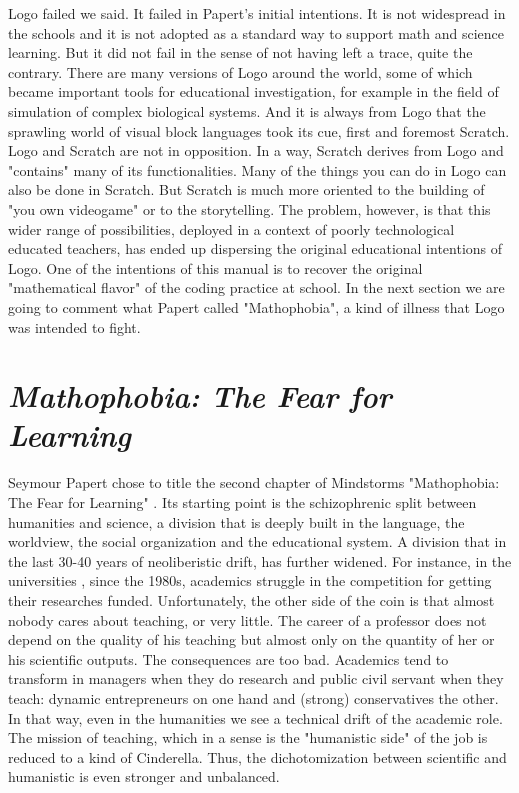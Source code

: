 Logo failed we said. It failed in Papert's initial intentions. It is not widespread in the schools and it is not adopted as a standard way to support math and science learning. But it did not fail in the sense of not having left a trace, quite the contrary. There are many versions of Logo around the world, some of which became important tools for educational investigation, for example in the field of simulation of complex biological systems. And it is always from Logo that the sprawling world of visual block languages took its cue, first and foremost Scratch. Logo and Scratch are not in opposition. In a way, Scratch derives from Logo and "contains" many of its functionalities. Many of the things you can do in Logo can also be done in Scratch. But Scratch is much more oriented to the building of "you own videogame" or to the storytelling. The problem, however, is that this wider range of possibilities, deployed in a context of poorly technological educated teachers, has ended up dispersing the original educational intentions of Logo. One of the intentions of this manual is to recover the original "mathematical flavor" of the coding practice at school. In the next section we are going to comment what Papert called "Mathophobia", a kind of illness that Logo was intended to fight. 

\section{\textit{\textit{Mathophobia}: The Fear for Learning}}

Seymour Papert chose to title the second chapter of Mindstorms "Mathophobia: The Fear for Learning" . Its starting point is the schizophrenic split between humanities and science, a division that is deeply built in the language, the worldview, the social organization and the educational system. A division that in the last 30-40 years of neoliberistic drift, has further widened. For instance, in the universities , since the 1980s, academics struggle in the competition for getting their researches funded. Unfortunately, the other side of the coin is that almost nobody cares about teaching, or very little. The career of a professor does not depend on the quality of his teaching but almost only on the quantity of her or his scientific outputs. The consequences are too bad. Academics tend to transform in managers when they do research and public civil servant when they teach: dynamic entrepreneurs on one hand and (strong) conservatives the other. In that way, even in the humanities we see a technical drift of the academic role. The mission of teaching, which in a sense is the "humanistic side"  of the job  is reduced to a kind of Cinderella. Thus, the dichotomization between scientific and humanistic is even stronger and unbalanced.

